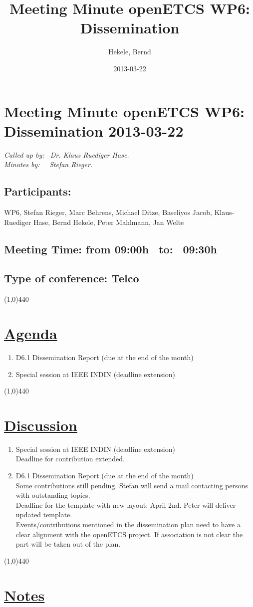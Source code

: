 \documentclass[a4paper]{article}
\title{Meeting Minute openETCS WP6: Dissemination}
\author{Hekele, Bernd}
\date{2013-03-22}
\begin{document}
\section*{\large{Meeting Minute openETCS WP6: Dissemination 2013-03-22}}

\emph{Called up by: \ Dr. Klaus Ruediger Hase.}\\
\emph{Minutes by: \ \  Stefan Rieger.}

\subsection*{Participants:} WP6, 
Stefan Rieger, 
Marc Behrens, 
Michael Ditze,
Baseliyos Jacob,
Klaus-Ruediger Hase, 
Bernd Hekele,
Peter Mahlmann, 
Jan Welte\\

\subsection*{Meeting Time: from 09:00h \ to: \ 09:30h}

\subsection*{Type of conference: Telco}

\line(1,0){440}
\section*{\underline{Agenda}}
\begin{enumerate}
\item  D6.1 Dissemination Report (due at the end of the month) 
\item Special session at IEEE INDIN (deadline extension) 
\end{enumerate}
\line(1,0){440}
\section*{\underline{Discussion}}

\begin{enumerate}

\item Special session at IEEE INDIN (deadline extension) \\
Deadline for contribution extended. 

\item  D6.1 Dissemination Report (due at the end of the month)\\
Some contributions still pending. Stefan will send a mail contacting persons with outstanding topics.\\
Deadline for the template with new layout: April 2nd. Peter will deliver updated template.\\
Events/contributions mentioned in the dissemination plan need to have a clear alignment with the openETCS project. If association is not clear the part will be taken out of the plan.

\end{enumerate}

\line(1,0){440}
\section*{\underline{Notes}}
\end{document}
